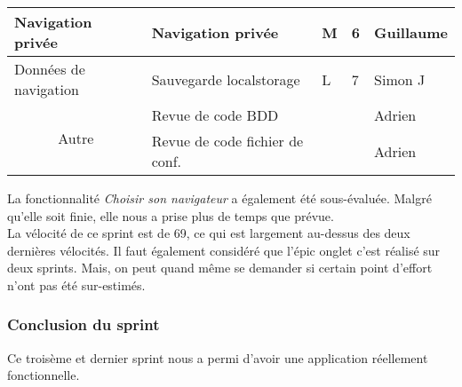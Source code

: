 \documentclass[10pt,a4paper]{article}
\begin{document}
\begin{table}[h]
\begin{tabular}{|c|l|l|l|l|}
\multicolumn{1}{|l|}{Navigation privée}     & Navigation privée                                                                           & M                                            & 6                                           & Guillaume          \\ \hline
\multicolumn{1}{|l|}{Données de navigation} & Sauvegarde localstorage                                                                     & L                                            & 7                                           & Simon J            \\ \hline
\multirow{2}{*}{Autre}                      & Revue de code BDD                                                                           &                                              &                                             & Adrien             \\ \cline{2-5} 
                                            & Revue de code fichier de conf.                                                              &                                              &                                             & Adrien             \\ \hline
\end{tabular}
\end{table}

La fonctionnalité \textit{Choisir son navigateur} a également été sous-évaluée. Malgré qu'elle soit finie, elle nous a prise plus de temps que prévue. \\

La vélocité de ce sprint est de 69, ce qui est largement au-dessus des deux dernières vélocités. Il faut également considéré que l'épic onglet c'est réalisé sur deux sprints. Mais, on peut quand même se demander si certain point d'effort n'ont pas été sur-estimés.

\subsubsection{Conclusion du sprint}
Ce troisème et dernier sprint nous a permi d'avoir une application réellement fonctionnelle.
\end{document}
